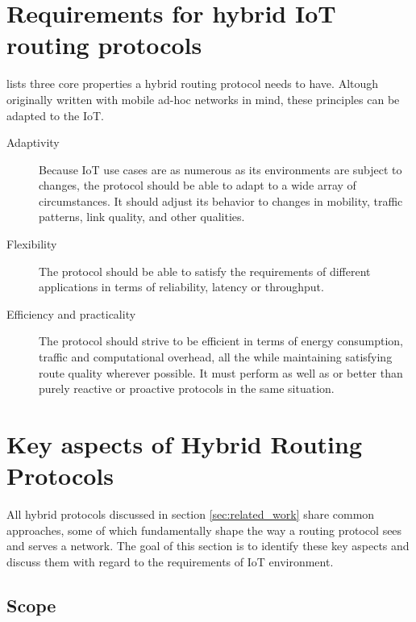 \documentclass[a4paper,10pt]{scrartcl}
\begin{document}
\section{Requirements for hybrid IoT routing protocols}
\label{subsec:requirements}
\cite{SHARP} lists three core properties a hybrid routing protocol needs to have. Altough originally written with mobile ad-hoc networks in mind, these principles can be adapted to the IoT.
\begin{description}
\item[Adaptivity] Because IoT use cases are as numerous as its environments are subject to changes, the protocol should be able to adapt to a wide array of circumstances. It should adjust its behavior to changes in mobility, traffic patterns, link quality, and other qualities.
\item[Flexibility] The protocol should be able to satisfy the requirements of different applications in terms of reliability, latency or throughput.
\item[Efficiency and practicality] The protocol should strive to be efficient in terms of energy consumption, traffic and computational overhead, all the while maintaining satisfying route quality wherever possible. It must perform as well as or better than purely reactive or proactive protocols in the same situation.
\end{description}


\section{Key aspects of Hybrid Routing Protocols}
\label{sec:key_aspects}
All hybrid protocols discussed in section \ref{sec:related_work} share common approaches, some of which fundamentally shape the way a routing protocol sees and serves a network. The goal of this section is to identify these key aspects and discuss them with regard to the requirements of IoT environment.

\subsection{Scope}
\label{subsec:scope}
\end{document}
